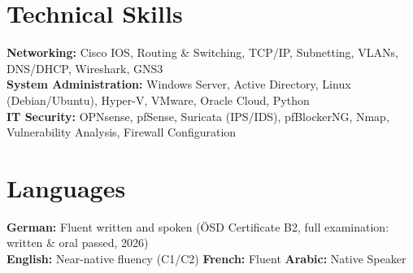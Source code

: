 \documentclass[10pt,a4paper]{article}
\begin{document}
\section*{Technical Skills}
\textbf{Networking:} Cisco IOS, Routing \& Switching, TCP/IP, Subnetting, VLANs, DNS/DHCP, Wireshark, GNS3 \\
\textbf{System Administration:} Windows Server, Active Directory, Linux (Debian/Ubuntu), Hyper-V, VMware, Oracle Cloud, Python \\
\textbf{IT Security:} OPNsense, pfSense, Suricata (IPS/IDS), pfBlockerNG, Nmap, Vulnerability Analysis, Firewall Configuration

\section*{Languages}
\textbf{German:} Fluent written and spoken (ÖSD Certificate B2, full examination: written \& oral passed, 2026) \\
\textbf{English:} Near-native fluency (C1/C2) \textbar{} \textbf{French:} Fluent \textbar{} \textbf{Arabic:} Native Speaker
\end{document}
